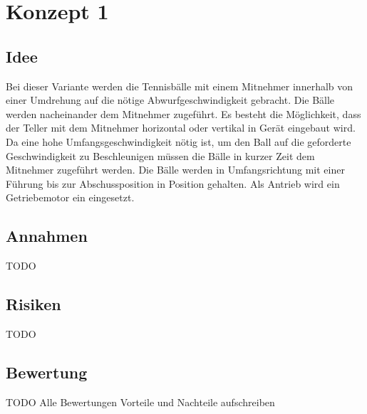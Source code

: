 \section{Konzept 1}

\subsection{Idee}
Bei dieser Variante werden die Tennisbälle mit einem Mitnehmer innerhalb von einer Umdrehung auf die nötige Abwurfgeschwindigkeit gebracht. Die Bälle werden nacheinander dem Mitnehmer zugeführt. Es besteht die Möglichkeit, dass der Teller mit dem Mitnehmer horizontal oder vertikal in Gerät eingebaut wird. Da eine hohe Umfangsgeschwindigkeit nötig ist, um den Ball auf die geforderte Geschwindigkeit zu Beschleunigen müssen die Bälle in kurzer Zeit dem Mitnehmer zugeführt werden. Die Bälle werden in Umfangsrichtung mit einer Führung bis zur Abschussposition in Position gehalten. Als Antrieb wird ein Getriebemotor ein eingesetzt.  

\subsection{Annahmen}
TODO

\subsection{Risiken}
TODO

\subsection{Bewertung}
TODO Alle Bewertungen
Vorteile und Nachteile aufschreiben